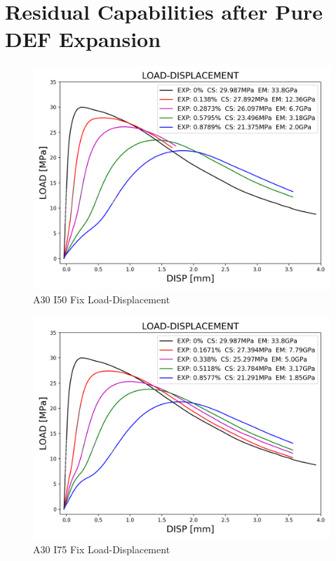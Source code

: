 \clearpage

\section{Residual Capabilities after Pure DEF Expansion}


\begin{figure}[ht]
\centering
\includegraphics[width=.8\linewidth]{Files/exp_3D/DEF/S13A30FIXX0-LOAD-DISPLACEMENT.png}
  \caption{A30 I50 Fix Load-Displacement}
  \label{fig:A30X0FIX_LD}
\end{figure}


\begin{figure}[ht]
\centering
\includegraphics[width=.8\linewidth]{Files/exp_3D/DEF/S13A30FIXX-5-LOAD-DISPLACEMENT.png}
  \caption{A30 I75 Fix Load-Displacement}
  \label{fig:A30X-5FIX_LD}
\end{figure}

